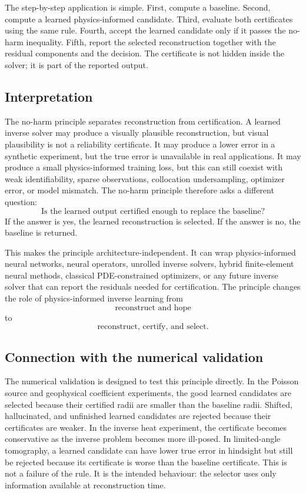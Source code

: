 \documentclass{article}
\numberwithin{equation}{section}
\theoremstyle{definition}
\begin{document}
The step-by-step application is simple. First, compute a baseline. Second, compute a learned physics-informed candidate. Third, evaluate both certificates using the same rule. Fourth, accept the learned candidate only if it passes the no-harm inequality. Fifth, report the selected reconstruction together with the residual components and the decision. The certificate is not hidden inside the solver; it is part of the reported output.

\subsection{Interpretation}

The no-harm principle separates reconstruction from certification. A learned inverse solver may produce a visually plausible reconstruction, but visual plausibility is not a reliability certificate. It may produce a lower error in a synthetic experiment, but the true error is unavailable in real applications. It may produce a small physics-informed training loss, but this can still coexist with weak identifiability, sparse observations, collocation undersampling, optimizer error, or model mismatch. The no-harm principle therefore asks a different question:
\[
\text{Is the learned output certified enough to replace the baseline?}
\]
If the answer is yes, the learned reconstruction is selected. If the answer is no, the baseline is returned.

This makes the principle architecture-independent. It can wrap physics-informed neural networks, neural operators, unrolled inverse solvers, hybrid finite-element neural methods, classical PDE-constrained optimizers, or any future inverse solver that can report the residuals needed for certification. The principle changes the role of physics-informed inverse learning from
\[
\text{reconstruct and hope}
\]
to
\[
\text{reconstruct, certify, and select}.
\]

\subsection{Connection with the numerical validation}

The numerical validation is designed to test this principle directly. In the Poisson source and geophysical coefficient experiments, the good learned candidates are selected because their certified radii are smaller than the baseline radii. Shifted, hallucinated, and unfinished learned candidates are rejected because their certificates are weaker. In the inverse heat experiment, the certificate becomes conservative as the inverse problem becomes more ill-posed. In limited-angle tomography, a learned candidate can have lower true error in hindsight but still be rejected because its certificate is worse than the baseline certificate. This is not a failure of the rule. It is the intended behaviour: the selector uses only information available at reconstruction time.
\end{document}
